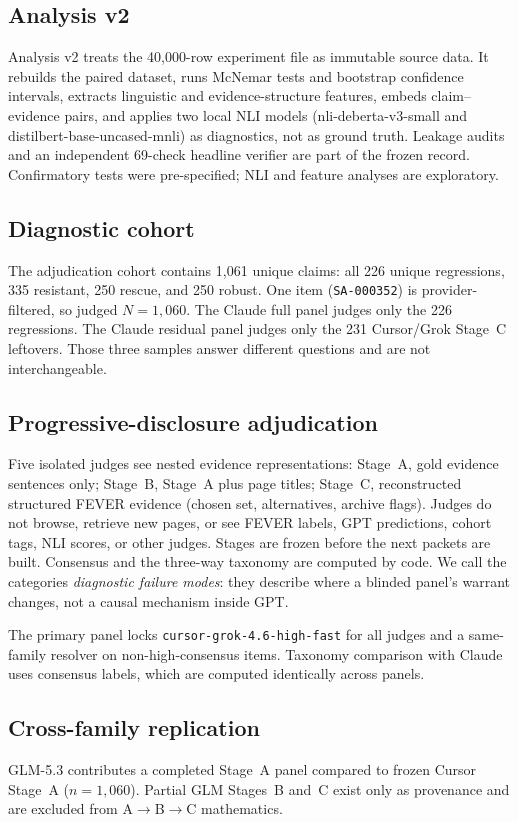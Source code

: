\subsection{Analysis v2}
Analysis v2 treats the 40{,}000-row experiment file as immutable source data.
It rebuilds the paired dataset, runs McNemar tests and bootstrap confidence intervals, extracts linguistic and evidence-structure features, embeds claim--evidence pairs, and applies two local NLI models (nli-deberta-v3-small and distilbert-base-uncased-mnli) as diagnostics, not as ground truth.
Leakage audits and an independent 69-check headline verifier are part of the frozen record.
Confirmatory tests were pre-specified; NLI and feature analyses are exploratory.

\subsection{Diagnostic cohort}
The adjudication cohort contains 1{,}061 unique claims: all 226 unique regressions, 335 resistant, 250 rescue, and 250 robust.
One item (\texttt{SA-000352}) is provider-filtered, so judged $N=1{,}060$.
The Claude full panel judges only the 226 regressions.
The Claude residual panel judges only the 231 Cursor/Grok Stage~C leftovers.
Those three samples answer different questions and are not interchangeable.

\subsection{Progressive-disclosure adjudication}
\label{sec:protocol}
Five isolated judges see nested evidence representations:
Stage~A, gold evidence sentences only;
Stage~B, Stage~A plus page titles;
Stage~C, reconstructed structured FEVER evidence (chosen set, alternatives, archive flags).
Judges do not browse, retrieve new pages, or see FEVER labels, GPT predictions, cohort tags, NLI scores, or other judges.
Stages are frozen before the next packets are built.
Consensus and the three-way taxonomy are computed by code.
We call the categories \emph{diagnostic failure modes}: they describe where a blinded panel's warrant changes, not a causal mechanism inside GPT.

The primary panel locks \texttt{cursor-grok-4.6-high-fast} for all judges and a same-family resolver on non-high-consensus items.
Taxonomy comparison with Claude uses consensus labels, which are computed identically across panels.

\subsection{Cross-family replication}
\label{sec:cross-family-design}
GLM-5.3 contributes a completed Stage~A panel compared to frozen Cursor Stage~A ($n=1{,}060$).
Partial GLM Stages~B and~C exist only as provenance and are excluded from A$\rightarrow$B$\rightarrow$C mathematics.

